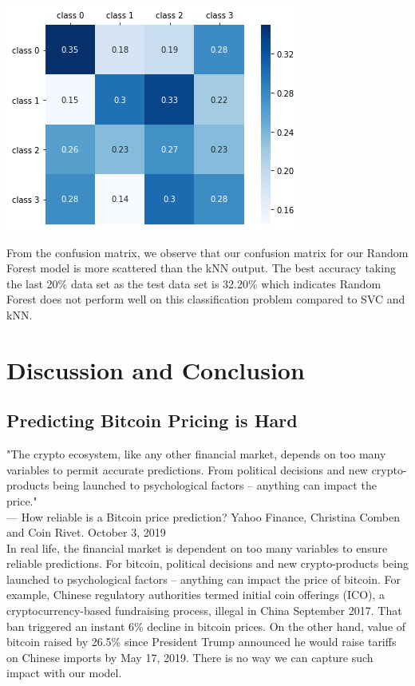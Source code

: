 \documentclass[9pt,twocolumn,twoside]{ilcss}
\begin{document}
\begin{center}
\includegraphics[scale=0.35]{rf_test.png}
\end{center}

From the confusion matrix, we observe that our confusion matrix for our Random Forest model is more scattered than the kNN output. The best accuracy taking the last 20\% data set as the test data set is 32.20\% which indicates Random Forest does not perform well on this classification problem compared to SVC and kNN.

\section{Discussion and Conclusion}
\subsection*{Predicting Bitcoin Pricing is Hard}
"The crypto ecosystem, like any other financial market, depends on too many variables to permit accurate predictions. From political decisions and new crypto-products being launched to psychological factors – anything can impact the price."
\\[3pt]
--- How reliable is a Bitcoin price prediction? Yahoo Finance, Christina Comben and Coin Rivet. October 3, 2019
\\[3pt]

In real life, the financial market is dependent on too many variables to ensure reliable predictions. For bitcoin, political decisions and new crypto-products being launched to psychological factors – anything can impact the price of bitcoin. For example, Chinese regulatory authorities termed initial coin offerings (ICO), a cryptocurrency-based fundraising process, illegal in China September 2017. That ban triggered an instant 6\% decline in bitcoin prices. On the other hand, value of bitcoin raised by 26.5\% since President Trump announced he would raise tariffs on Chinese imports by May 17, 2019. There is no way we can capture such impact with our model. 
\end{document}
